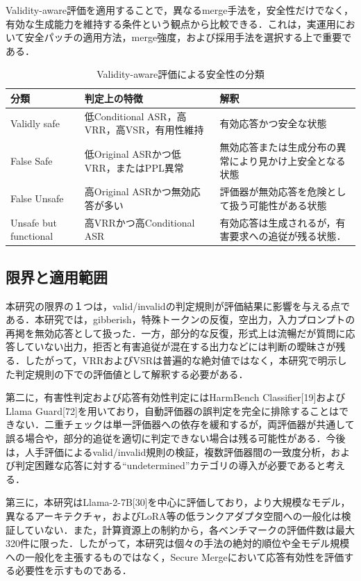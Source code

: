 \documentclass{article}
\begin{document}
Validity-aware評価を適用することで，異なるmerge手法を，安全性だけでなく，有効な生成能力を維持する条件という観点から比較できる．これは，実運用において安全パッチの適用方法，merge強度，および採用手法を選択する上で重要である．

\begin{table}[t]
\centering
\caption{Validity-aware評価による安全性の分類}
\label{tab:validity_categories}
\small
\begin{tabular}{p{2.8cm}p{5.1cm}p{5.1cm}}
\toprule
\textbf{分類} & \textbf{判定上の特徴} & \textbf{解釈} \\
\midrule
Validly safe &
低Conditional ASR，高VRR，高VSR，有用性維持 & 有効応答かつ安全な状態 \\
\addlinespace
False Safe & 低Original ASRかつ低VRR，またはPPL異常 & 無効応答または生成分布の異常により見かけ上安全となる状態 \\
\addlinespace
False Unsafe & 高Original ASRかつ無効応答が多い & 評価器が無効応答を危険として扱う可能性がある状態 \\
\addlinespace
Unsafe but functional & 高VRRかつ高Conditional ASR & 有効応答は生成されるが，有害要求への追従が残る状態． \\
\bottomrule
\end{tabular}
\end{table}

\subsection{限界と適用範囲}
本研究の限界の１つは，valid/invalidの判定規則が評価結果に影響を与える点である．本研究では，gibberish，特殊トークンの反復，空出力，入力プロンプトの再掲を無効応答として扱った．一方，部分的な反復，形式上は流暢だが質問に応答していない出力，拒否と有害追従が混在する出力などには判断の曖昧さが残る．したがって，VRRおよびVSRは普遍的な絶対値ではなく，本研究で明示した判定規則の下での評価値として解釈する必要がある．

第二に，有害性判定および応答有効性判定にはHarmBench Classifier[19]およびLlama Guard[72]を用いており，自動評価器の誤判定を完全に排除することはできない．二重チェックは単一評価器への依存を緩和するが，両評価器が共通して誤る場合や，部分的追従を適切に判定できない場合は残る可能性がある．今後は，人手評価によるvalid/invalid規則の検証，複数評価器間の一致度分析，および判定困難な応答に対する``undetermined''カテゴリの導入が必要であると考える．

第三に，本研究はLlama-2-7B[30]を中心に評価しており，より大規模なモデル，異なるアーキテクチャ，およびLoRA等の低ランクアダプタ空間への一般化は検証していない．また，計算資源上の制約から，各ベンチマークの評価件数は最大320件に限った．したがって，本研究は個々の手法の絶対的順位や全モデル規模への一般化を主張するものではなく，Secure Mergeにおいて応答有効性を評価する必要性を示すものである．
\end{document}
